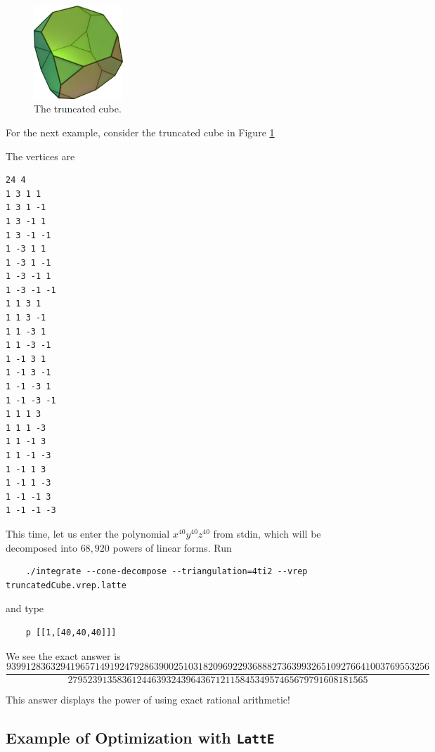 \documentclass{article}
\newcommand{\latte}{{\tt LattE}\xspace}
\begin{document}
\begin{figure}[thb]
	\centering
	\includegraphics[width=0.3\textwidth]{truncatedCube.jpg}
\caption{The truncated cube.}
	\label{fig:truncated-cube}
\end{figure}	
	
For the next example, consider the truncated cube in Figure \ref{fig:truncated-cube}	

	
The vertices are
\begin{verbatim}
24 4
1 3 1 1
1 3 1 -1
1 3 -1 1
1 3 -1 -1
1 -3 1 1
1 -3 1 -1
1 -3 -1 1
1 -3 -1 -1
1 1 3 1
1 1 3 -1
1 1 -3 1
1 1 -3 -1
1 -1 3 1
1 -1 3 -1
1 -1 -3 1
1 -1 -3 -1
1 1 1 3
1 1 1 -3
1 1 -1 3
1 1 -1 -3
1 -1 1 3
1 -1 1 -3
1 -1 -1 3
1 -1 -1 -3
\end{verbatim}

This time, let us enter the polynomial $x^{40}y^{40}z^{40}$ from stdin, which
will be decomposed into $68,920$ powers of linear forms. Run
	
	\begin{verbatim}
	./integrate --cone-decompose --triangulation=4ti2 --vrep truncatedCube.vrep.latte 
	\end{verbatim}

and type
	\begin{verbatim}
	p [[1,[40,40,40]]]
	\end{verbatim}


We see the exact answer is 
\begin{displaymath}
\frac{93991283632941965714919247928639002510318209692293688827363993265109276641003769553256}{2795239135836124463932439643671211584534957465679791608181565}
\end{displaymath}
	
This answer displays the power of using exact rational arithmetic!	


\subsection{Example of Optimization with \latte}
\end{document}
